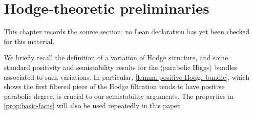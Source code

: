 \chapter{Hodge-theoretic preliminaries}
\label{geometric-local-systems-general-curves-isomonodromy-chapter-04}

\begin{remark}
\label{geometric-local-systems-general-curves-isomonodromy-chapter-04-source}
This chapter records the source section; no Lean declaration has yet been checked for this material.
\notready
\end{remark}

\label{section:hodge-theoretic-preliminaries}

We briefly recall the definition of a variation of Hodge structure, and some standard positivity and semistability results for the (parabolic Higgs) bundles associated to such variations.
In particular, \autoref{lemma:positive-Hodge-bundle}, which shows the first
filtered piece of the Hodge filtration tends to have positive parabolic degree, is crucial
to our semistability arguments.
The properties in \autoref{prop:basic-facts} will also be used repeatedly in this
paper

